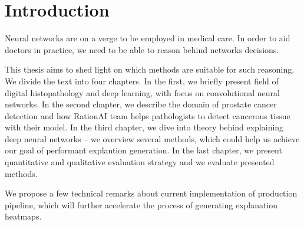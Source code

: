 \chapter{Introduction}\label{chap:introduction}

Neural networks are on a verge to be employed in medical care. In order to aid doctors in practice, we need to be able to reason behind networks decisions.

This thesis aims to shed light on which methods are suitable for such reasoning. We divide the text into four chapters. In the first, we briefly present field of digital histopathology and deep learning, with focus on convolutional neural networks. In the second chapter, we describe the domain of prostate cancer detection and how RationAI team helps pathologists to detect cancerous tissue with their model. In the third chapter, we dive into theory behind explaining deep neural networks -- we overview several methods, which could help us achieve our goal of performant explantion generation. In the last chapter, we present quantitative and qualitative evaluation strategy and we evaluate presented methods.

We propose a few technical remarks about current implementation of production pipeline, which will further accelerate the process of generating explanation heatmaps.